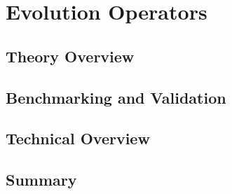
\chapter{Evolution Operators}
\label{ch:eko}
\minitoc
\adjustmtc



\section{Theory Overview}
\label{sec:eko/theory}


\section{Benchmarking and Validation}
\label{sec:eko/pheno}


\section{Technical Overview}
\label{sec:eko/code}


\section{Summary}
\label{sec:eko/concl}

